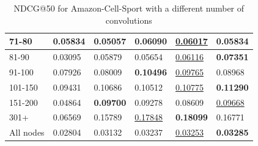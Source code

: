 \begin{table}[]
\begin{tabular}{|l|l|l|l|l|l|}
        71-80   & 0.05834                    & 0.05057                    & \textbf{0.06090}           & \underline{0.06017}        & 0.05834                    \\ \hline
        81-90   & 0.03095                    & 0.05879                    & 0.05654                    & \underline{0.06116}        & \textbf{0.07351}           \\ \hline
        91-100  & 0.07926                    & 0.08009                    & \textbf{0.10496}           & \underline{0.09765}        & 0.08968                    \\ \hline
        101-150 & 0.09431                    & 0.10686                    & 0.10512                    & \underline{0.10775}        & \textbf{0.11290}           \\ \hline
        151-200 & 0.04864                    & \textbf{0.09700}           & 0.09278                    & 0.08609                    & \underline{0.09668}        \\ \hline
        301+    & 0.06569                    & 0.15789                    & \underline{0.17848}        & \textbf{0.18099}           & 0.16771                    \\ \hline
        All nodes & 0.02804                    & 0.03132                    & 0.03237                    & \underline{0.03253}        & \textbf{0.03285}           \\ \hline
    \end{tabular}
    \caption{NDCG@50 for Amazon-Cell-Sport with a different number of convolutions}
    \label{tab:Amazon-cell-sport-con-evaluation}
\end{table}

